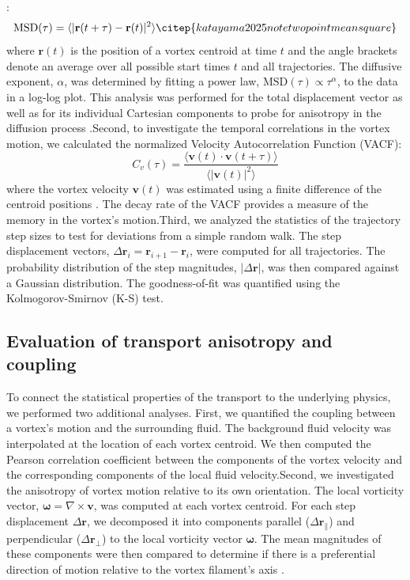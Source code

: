 \documentclass[]{article}
\begin{document}
\citep{bailey2022logitfitactive}:\begin{equation}\text{MSD}(\tau) = \langle |\mathbf{r}(t+\tau) - \mathbf{r}(t)|^2 \rangle  \citep{katayama2025notetwopointmeansquare}\end{equation}where $\mathbf{r}(t)$ is the position of a vortex centroid at time $t$ and the angle brackets denote an average over all possible start times $t$ and all trajectories. The diffusive exponent, $\alpha$, was determined by fitting a power law, $\text{MSD}(\tau) \propto \tau^\alpha$, to the data in a log-log plot. This analysis was performed for the total displacement vector as well as for its individual Cartesian components to probe for anisotropy in the diffusion process  \citep{mcclure2026collectivevortexdynamicsisolated}.Second, to investigate the temporal correlations in the vortex motion, we calculated the normalized Velocity Autocorrelation Function (VACF):  \citep{bradley2025velocitycorrelationsvorticesrarefaction}\begin{equation}C_v(\tau) = \frac{\langle \mathbf{v}(t) \cdot \mathbf{v}(t+\tau) \rangle}{\langle |\mathbf{v}(t)|^2 \rangle}\end{equation}where the vortex velocity $\mathbf{v}(t)$ was estimated using a finite difference of the centroid positions  \citep{ashraf2025experimentalinvestigationwaterexit}. The decay rate of the VACF provides a measure of the memory in the vortex's motion.Third, we analyzed the statistics of the trajectory step sizes to test for deviations from a simple random walk. The step displacement vectors, $\Delta \mathbf{r}_i = \mathbf{r}_{i+1} - \mathbf{r}_i$, were computed for all trajectories. The probability distribution of the step magnitudes, $|\Delta \mathbf{r}|$, was then compared against a Gaussian distribution. The goodness-of-fit was quantified using the Kolmogorov-Smirnov (K-S) test.\subsection{Evaluation of transport anisotropy and coupling}To connect the statistical properties of the transport to the underlying physics, we performed two additional analyses. First, we quantified the coupling between a vortex's motion and the surrounding fluid. The background fluid velocity was interpolated at the location of each vortex centroid. We then computed the Pearson correlation coefficient between the components of the vortex velocity and the corresponding components of the local fluid velocity.Second, we investigated the anisotropy of vortex motion relative to its own orientation. The local vorticity vector, $\boldsymbol{\omega} = \nabla \times \mathbf{v}$, was computed at each vortex centroid. For each step displacement $\Delta\mathbf{r}$, we decomposed it into components parallel ($\Delta\mathbf{r}_\parallel$) and perpendicular ($\Delta\mathbf{r}_\perp$) to the local vorticity vector $\boldsymbol{\omega}$. The mean magnitudes of these components were then compared to determine if there is a preferential direction of motion relative to the vortex filament's axis  \citep{zhang2019imaginganisotropicvortexdynamics}.
\end{document}
